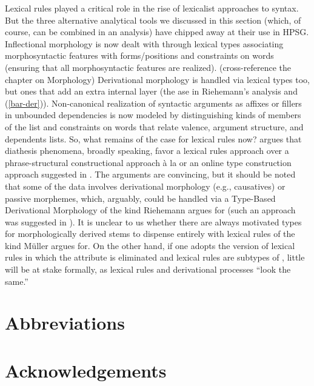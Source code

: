 \documentclass[output=paper]{langsci/langscibook}
\begin{document}
Lexical rules played a critical role in the rise of lexicalist approaches to syntax. But the three alternative analytical tools we discussed in this section (which, of course, can be combined in an analysis) have chipped away at their use in HPSG. Inflectional morphology is now dealt with through lexical types associating morphosyntactic features with forms/positions and constraints on words (ensuring that all morphosyntactic features are realized). (cross-reference the chapter on Morphology)
Derivational morphology is handled via lexical types too, but ones that add an extra internal layer (the ase in Riehemann's analysis and (\ref{bar-der})). 
Non-canonical realization of syntactic arguments as affixes or fillers in unbounded dependencies is now modeled by distinguishing kinds of members of the  list and constraints on words that relate valence, argument structure, and dependents lists. So, what remains of the case for lexical rules now? \citet{Mueller2006,MuellerPersian} argues that diathesis phenomena, broadly speaking, favor a lexical rules approach over a phrase-structural constructional approach à la \citet{Goldberg95a} or an online type construction approach suggested in . The arguments are convincing, but it should be noted that some of the data involves derivational morphology (e.g., causatives) or passive morphemes, which, arguably, could be handled via a Type-Based Derivational Morphology of the kind Riehemann argues for (such an approach was suggested in \citet[Chapter~4]{Koenig99a}). 
It is unclear to us whether there are always motivated types for morphologically derived stems to dispense entirely with lexical rules of the kind Müller argues for. On the other hand, if one adopts the version of lexical rules in which the  attribute is eliminated and lexical rules are subtypes of , little will be at stake formally, as lexical rules and derivational processes ``look the same.'' 




 
\section*{Abbreviations}
\section*{Acknowledgements}

{\sloppy 
\printbibliography[heading=subbibliography,notkeyword=this] 
}
\end{document}
